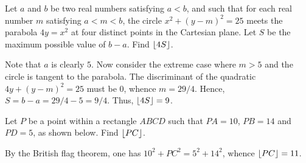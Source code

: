 \clearpage
\begin{question}[9]\label{A::2022-O-1-4}
    Let $a$ and $b$ be two real numbers satisfying $a < b$, and such that for each real number $m$ satisfying $a < m < b$, the circle $x^2 + (y-m)^2 = 25$ meets the parabola $4y = x^2$ at four distinct points in the Cartesian plane. Let $S$ be the maximum possible value of $b-a$. Find $\left\lfloor 4S \right\rfloor$.
\end{question}
\begin{solution*}
    Note that $a$ is clearly $5$. Now consider the extreme case where $m > 5$ and the circle is tangent to the parabola. The discriminant of the quadratic $4y + (y-m)^2 = 25$ must be 0, whence $m = 29/4$. Hence, $S = b - a = 29/4 - 5 = 9/4$. Thus, $\left\lfloor 4S \right\rfloor = 9$.
\end{solution*}

\begin{question}[11]\label{A::2022-O-1-5}
    Let $P$ be a point within a rectangle $ABCD$ such that $PA = 10$, $PB = 14$ and $PD = 5$, as shown below. Find $\left\lfloor PC \right\rfloor$.
    
    \begin{center}
    \end{center}
\end{question}
\begin{solution*}
    By the British flag theorem, one has $10^2 + PC^2 = 5^2 + 14^2$, whence $\left\lfloor PC \right\rfloor = 11$.
\end{solution*}

